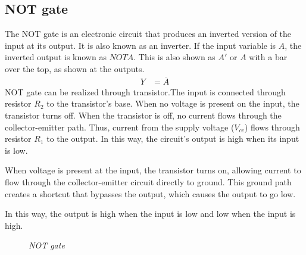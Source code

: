 	\subsection{NOT gate}
	The NOT gate is an electronic circuit that produces an inverted version of the input at its output. It is also known as an inverter. If the input variable is $A$, the inverted output is known as $NOT A$. This is also shown as $A'$ or $A$ with a bar over the top, as shown at the outputs.
	\begin{align*}
		Y &= \overline{A}
	\end{align*}
	NOT gate can be realized through transistor.The input is connected through resistor $R_2$ to the transistor’s base. When no voltage is present on the input, the transistor turns off. When the transistor is off, no current flows through the collector-emitter path. Thus, current from the supply voltage ($V_{cc}$) flows through resistor $R_1$ to the output. In this way, the circuit’s output is high when its input is low.
	
	When voltage is present at the input, the transistor turns on, allowing current to flow through the collector-emitter circuit directly to ground. This ground path creates a shortcut that bypasses the output, which causes the output to go low.
	
	In this way, the output is high when the input is low and low when the input is high.
	\begin{figure}[ht]
		\centering 
		\hfill
		\hfill
		\caption{\textit{NOT gate}}
	\end{figure}
		
